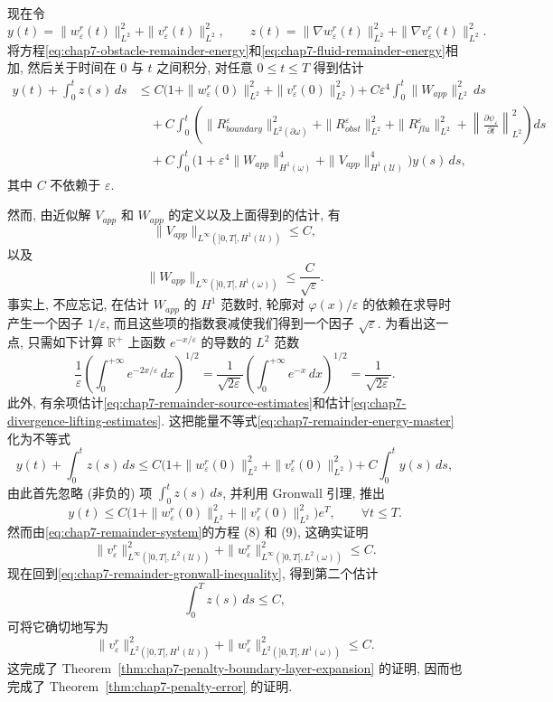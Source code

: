 \begin{sloppypar}
{现在令
\[
 y(t)=\|w_\varepsilon^r(t)\|_{L^2}^2+\|v_\varepsilon^r(t)\|_{L^2}^2,
 \qquad
 z(t)=\|\nabla w_\varepsilon^r(t)\|_{L^2}^2+\|\nabla v_\varepsilon^r(t)\|_{L^2}^2.
\]
将方程\eqref{eq:chap7-obstacle-remainder-energy}和\eqref{eq:chap7-fluid-remainder-energy}相加, 然后关于时间在 $0$ 与 $t$ 之间积分, 对任意 $0\leq t\leq T$ 得到估计
\begin{equation}
\begin{split}
 y(t)+\int_0^t z(s)\,ds
 &\leq C\bigl(1+\|w_\varepsilon^r(0)\|_{L^2}^2+\|v_\varepsilon^r(0)\|_{L^2}^2\bigr)
 +C\varepsilon^4\int_0^t\|W_{app}\|_{L^2}^2\,ds\\
 &\quad+C\int_0^t\left(\|R_{boundary}^\varepsilon\|_{L^2(\partial\omega)}^2
 +\|R_{obst}^\varepsilon\|_{L^2}^2+\|R_{flu}^\varepsilon\|_{L^2}^2
 +\left\|\frac{\partial\psi_\varepsilon}{\partial t}\right\|_{L^2}^2\right)ds\\
 &\quad+C\int_0^t\bigl(1+\varepsilon^4\|W_{app}\|_{H^1(\omega)}^4
 +\|V_{app}\|_{H^1(\mathcal U)}^4\bigr)y(s)\,ds,
\end{split}
\label{eq:chap7-remainder-energy-master}
\end{equation}
其中 $C$ 不依赖于 $\varepsilon$.

然而, 由近似解 $V_{app}$ 和 $W_{app}$ 的定义以及上面得到的估计, 有
\[
 \|V_{app}\|_{L^\infty(]0,T[,H^1(\mathcal U))}\leq C,
\]
以及
\[
 \|W_{app}\|_{L^\infty(]0,T[,H^1(\omega))}\leq\frac C{\sqrt\varepsilon}.
\]
事实上, 不应忘记, 在估计 $W_{app}$ 的 $H^1$ 范数时, 轮廓对 $\varphi(x)/\varepsilon$ 的依赖在求导时产生一个因子 $1/\varepsilon$, 而且这些项的指数衰减使我们得到一个因子 $\sqrt\varepsilon$. 为看出这一点, 只需如下计算 $\mathbb R^+$ 上函数 $e^{-x/\varepsilon}$ 的导数的 $L^2$ 范数
\[
 \frac1\varepsilon\left(\int_0^{+\infty}e^{-2x/\varepsilon}\,dx\right)^{1/2}
 =\frac1{\sqrt{2\varepsilon}}\left(\int_0^{+\infty}e^{-x}\,dx\right)^{1/2}
 =\frac1{\sqrt{2\varepsilon}}.
\]
此外, 有余项估计\eqref{eq:chap7-remainder-source-estimates}和估计\eqref{eq:chap7-divergence-lifting-estimates}. 这把能量不等式\eqref{eq:chap7-remainder-energy-master}化为不等式
\begin{equation}
 y(t)+\int_0^t z(s)\,ds
 \leq C\bigl(1+\|w_\varepsilon^r(0)\|_{L^2}^2+\|v_\varepsilon^r(0)\|_{L^2}^2\bigr)
 +C\int_0^t y(s)\,ds,
\label{eq:chap7-remainder-gronwall-inequality}
\end{equation}
由此首先忽略 (非负的) 项 $\int_0^t z(s)\,ds$, 并利用 Gronwall 引理, 推出
\[
 y(t)\leq C\bigl(1+\|w_\varepsilon^r(0)\|_{L^2}^2+\|v_\varepsilon^r(0)\|_{L^2}^2\bigr)e^T,
 \qquad\forall t\leq T.
\]
然而由\eqref{eq:chap7-remainder-system}的方程 (8) 和 (9), 这确实证明
\[
 \|v_\varepsilon^r\|_{L^\infty(]0,T[,L^2(\mathcal U))}^2
 +\|w_\varepsilon^r\|_{L^\infty(]0,T[,L^2(\omega))}^2\leq C.
\]
现在回到\eqref{eq:chap7-remainder-gronwall-inequality}, 得到第二个估计
\[
 \int_0^T z(s)\,ds\leq C,
\]
可将它确切地写为
\[
 \|v_\varepsilon^r\|_{L^2(]0,T[,H^1(\mathcal U))}^2
 +\|w_\varepsilon^r\|_{L^2(]0,T[,H^1(\omega))}^2\leq C.
\]
这完成了 Theorem~\ref{thm:chap7-penalty-boundary-layer-expansion} 的证明, 因而也完成了 Theorem~\ref{thm:chap7-penalty-error} 的证明.

}
\end{sloppypar}

